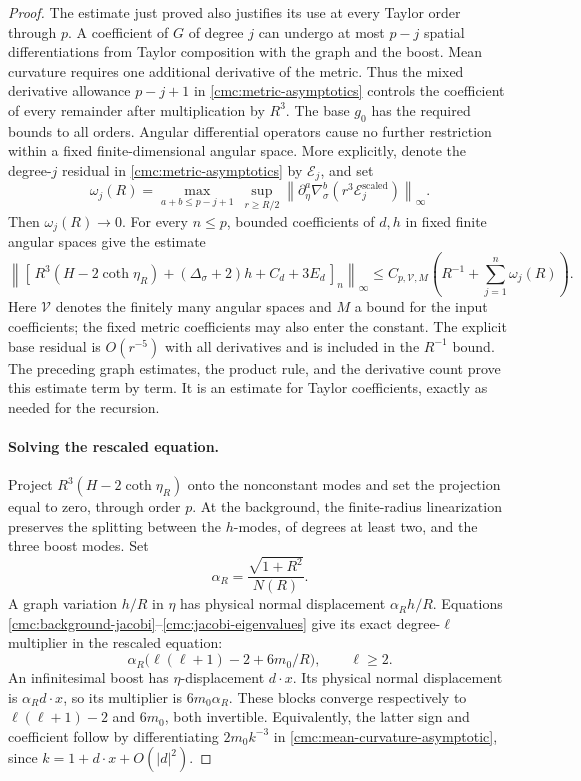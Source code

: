 \begin{proof}
The estimate just proved also justifies its use at every Taylor
order through \(p\).
A coefficient of \(G\) of degree \(j\) can undergo at most \(p-j\)
spatial differentiations from Taylor composition with the graph and
the boost.  Mean curvature requires one additional derivative of
the metric.  Thus the mixed derivative allowance \(p-j+1\) in
\eqref{cmc:metric-asymptotics} controls the coefficient of every
remainder after multiplication by \(R^3\).
The base \(g_0\) has the required bounds to all orders.
Angular differential operators cause no further restriction within
a fixed finite-dimensional angular space.
More explicitly, denote the degree-\(j\) residual in
\eqref{cmc:metric-asymptotics} by \(\mathcal E_j\), and set
\[
 \omega_j(R)=
 \max_{a+b\le p-j+1}\ 
 \sup_{r\ge R/2}
 \left\|\partial_\eta^a\nabla_\sigma^b
              (r^3\mathcal E_j^{\mathrm{scaled}})\right\|_\infty.
\]
Then \(\omega_j(R)\to0\).
For every \(n\le p\), bounded coefficients of \(d,h\) in fixed finite
angular spaces give the estimate
\[
 \left\|[\,
 R^3(H-2\coth\eta_R)+(\Delta_\sigma+2)h+C_d+3E_d\,]_n
       \right\|_\infty
 \le C_{p,\mathcal V,M}
       \left(R^{-1}+\sum_{j=1}^n\omega_j(R)\right).
\]
Here \(\mathcal V\) denotes the finitely many angular spaces and \(M\)
a bound for the input coefficients; the fixed metric coefficients
may also enter the constant.  The explicit base residual is
\(O(r^{-5})\) with all derivatives and is included in the
\(R^{-1}\) bound.  The preceding graph estimates, the product rule,
and the derivative count prove this estimate term by term.
It is an estimate for Taylor coefficients, exactly as needed for
the recursion.

\paragraph{Solving the rescaled equation.}
Project \(R^3(H-2\coth\eta_R)\) onto the nonconstant modes and set the
projection equal to zero, through order \(p\).
At the background, the finite-radius linearization preserves the
splitting between the \(h\)-modes, of degrees at least two, and the
three boost modes.
Set
\[
 \alpha_R=\frac{\sqrt{1+R^2}}{N(R)}.
\]
A graph variation \(h/R\) in \(\eta\) has physical normal
displacement \(\alpha_Rh/R\).  Equations
\eqref{cmc:background-jacobi}--\eqref{cmc:jacobi-eigenvalues} give its
exact degree-\(\ell\) multiplier in the rescaled equation:
\begin{equation}\label{cmc:scaled-inverse-blocks}
 \alpha_R\bigl(\ell(\ell+1)-2+6m_0/R\bigr),
 \qquad \ell\ge2.
\end{equation}
An infinitesimal boost has \(\eta\)-displacement \(d\cdot x\).
Its physical normal displacement is \(\alpha_Rd\cdot x\), so its
multiplier is \(6m_0\alpha_R\).
These blocks converge respectively to \(\ell(\ell+1)-2\) and
\(6m_0\), both invertible.
Equivalently, the latter sign and coefficient follow by
differentiating \(2m_0k^{-3}\) in
\eqref{cmc:mean-curvature-asymptotic}, since
\(k=1+d\cdot x+O(|d|^2)\).


\end{proof}

